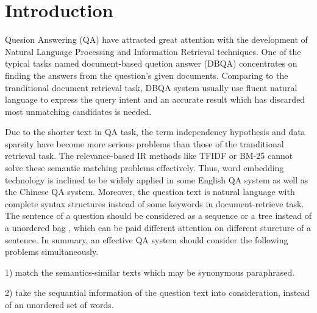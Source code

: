 \documentclass{llncs}
\begin{document}
\section{Introduction}
Quesion Answering (QA) have attracted great  attention with the development of Natural Language Processing and Information Retrieval techniques. One of the typical tasks named document-based quetion answer (DBQA) concentrates on finding the answers from the question's given documents.
Comparing to the tranditional document retrieval task, DBQA system usually use fluent natural language to express the query intent and an accurate result which has discarded most unmatching candidates is needed. 

Due to the shorter text in QA task, the term independency hypothesis and data sparsity  have become more serious problems than those of the tranditional retrieval task. The relevance-based IR methods like TFIDF or BM-25 cannot solve these semantic matching problems effectively. Thus, word embedding technology \cite{Mikolov2013Efficient} is inclined to  be widely applied in some English QA system as well as the Chinese QA system. Moreover, the question text is natural language with complete syntax structures instead of some keywords in document-retrieve task. The sentence of a question should be considered as a sequence or a tree instead of a unordered bag , which can be paid different attention on different sturcture of a sentence. In summary, an effective QA system should consider the following problems simultaneously.

1) match the semantics-similar texts which may be synonymous paraphrased.  

2) take the sequantial information of the question text into consideration, instead of an unordered set of words.
\end{document}
